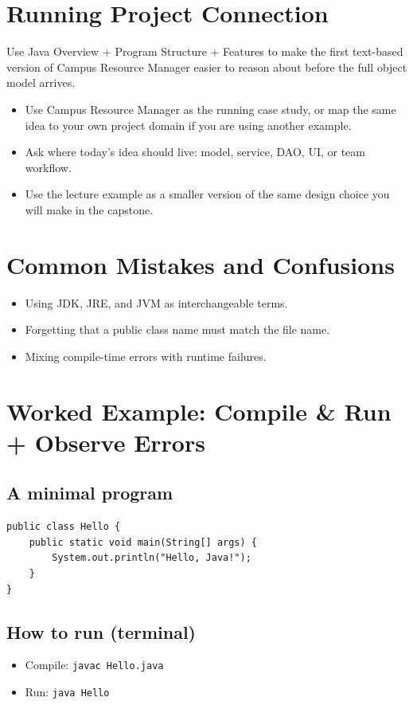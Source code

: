 \documentclass[11pt]{article}
\begin{document}
\section{Running Project Connection}
Use Java Overview + Program Structure + Features to make the first text-based version of Campus Resource Manager easier to reason about before the full object model arrives.
\begin{itemize}
  \item Use Campus Resource Manager as the running case study, or map the same idea to your own project domain if you are using another example.
  \item Ask where today's idea should live: model, service, DAO, UI, or team workflow.
  \item Use the lecture example as a smaller version of the same design choice you will make in the capstone.
\end{itemize}
\notesources{\OOPSUnitISources}

\section{Common Mistakes and Confusions}
\begin{itemize}
  \item Using JDK, JRE, and JVM as interchangeable terms.
  \item Forgetting that a public class name must match the file name.
  \item Mixing compile-time errors with runtime failures.
\end{itemize}
\notesources{\OOPSUnitISources}

\section{Worked Example: Compile \& Run + Observe Errors}
\subsection*{A minimal program}
\begin{lstlisting}
public class Hello {
    public static void main(String[] args) {
        System.out.println("Hello, Java!");
    }
}
\end{lstlisting}

\subsection*{How to run (terminal)}
\begin{itemize}
  \item Compile: \texttt{javac Hello.java}
  \item Run: \texttt{java Hello}
\end{itemize}
\end{document}
